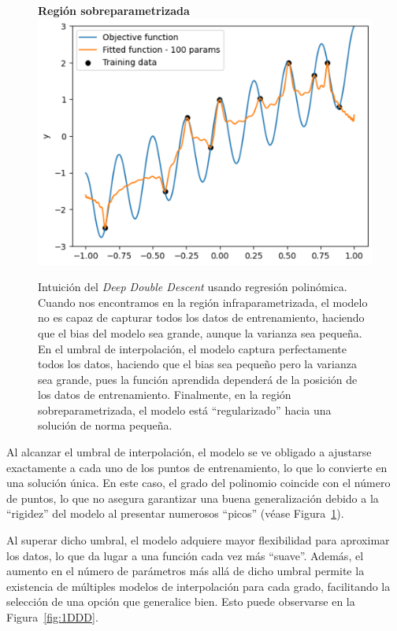 \begin{figure}[h]
\begin{minipage}{0.32\textwidth}
    \end{minipage}
    \begin{minipage}{0.32\textwidth}
        \centering
        \textbf{Región sobreparametrizada} \\[0.5ex] 
        \includegraphics[width=\linewidth]{img/experiments/legendre3.png}
    \end{minipage}
    \caption[Intuición del \textit{Deep Double Descent} usando regresión polinómica.]{Intuición del \textit{Deep Double Descent} usando regresión polinómica. Cuando nos encontramos en la región infraparametrizada, el modelo no es capaz de capturar todos los datos de entrenamiento, haciendo que el bias del modelo sea grande, aunque la varianza sea pequeña. En el umbral de interpolación, el modelo captura perfectamente todos los datos, haciendo que el bias sea pequeño pero la varianza sea grande, pues la función aprendida dependerá de la posición de los datos de entrenamiento. Finalmente, en la región sobreparametrizada, el modelo está ``regularizado'' hacia una solución de norma pequeña.}\label{fig:1dd}
\end{figure}

Al alcanzar el umbral de interpolación, el modelo se ve obligado a ajustarse exactamente a cada uno de los puntos de entrenamiento, lo que lo convierte en una solución única. En este caso, el grado del polinomio coincide con el número de puntos, lo que no asegura garantizar una buena generalización debido a la ``rigidez'' del modelo al presentar numerosos ``picos'' (véase Figura~\ref{fig:1dd}).\newline

Al superar dicho umbral, el modelo adquiere mayor flexibilidad para aproximar los datos, lo que da lugar a una función cada vez más ``suave''. Además, el aumento en el número de parámetros más allá de dicho umbral permite la existencia de múltiples modelos de interpolación para cada grado, facilitando la selección de una opción que generalice bien. Esto puede observarse en la Figura~\ref{fig:1DDD}.\newline

